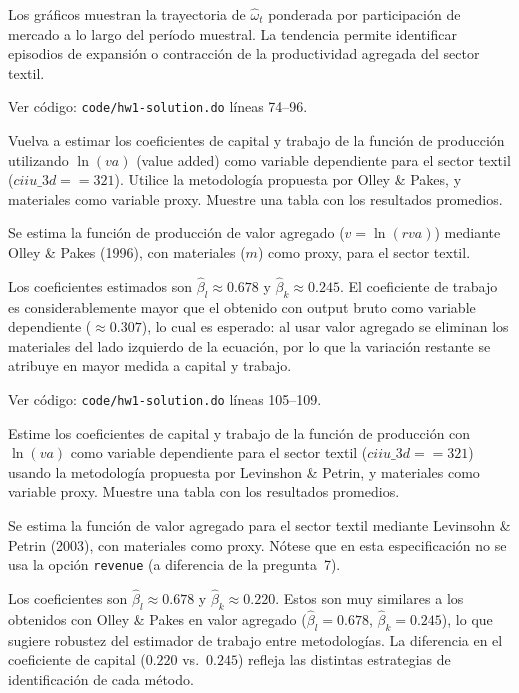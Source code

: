 \documentclass[answers]{exam}
\begin{document}
\begin{questions}
\begin{solution}
Los gráficos muestran la trayectoria de $\hat{\omega}_t$ ponderada por participación de mercado a lo largo del período muestral. La tendencia permite identificar episodios de expansión o contracción de la productividad agregada del sector textil.

Ver código: \texttt{code/hw1-solution.do} líneas 74--96.
\end{solution}

\question Vuelva a estimar los coeficientes de capital y trabajo de la función de producción utilizando $\ln(va)$ (value added) como variable dependiente para el sector textil ($\mathit{ciiu\_3d} == 321$). Utilice la metodología propuesta por Olley \& Pakes, y materiales como variable proxy. Muestre una tabla con los resultados promedios.

\begin{solution}
Se estima la función de producción de valor agregado ($v = \ln(\mathit{rva})$) mediante Olley \& Pakes (1996), con materiales ($m$) como proxy, para el sector textil.



Los coeficientes estimados son $\hat{\beta}_l \approx 0.678$ y $\hat{\beta}_k \approx 0.245$. El coeficiente de trabajo es considerablemente mayor que el obtenido con output bruto como variable dependiente ($\approx 0.307$), lo cual es esperado: al usar valor agregado se eliminan los materiales del lado izquierdo de la ecuación, por lo que la variación restante se atribuye en mayor medida a capital y trabajo.

Ver código: \texttt{code/hw1-solution.do} líneas 105--109.
\end{solution}

\question Estime los coeficientes de capital y trabajo de la función de producción con $\ln(va)$ como variable dependiente para el sector textil ($\mathit{ciiu\_3d} == 321$) usando la metodología propuesta por Levinshon \& Petrin, y materiales como variable proxy. Muestre una tabla con los resultados promedios.

\begin{solution}
Se estima la función de valor agregado para el sector textil mediante Levinsohn \& Petrin (2003), con materiales como proxy. Nótese que en esta especificación no se usa la opción \texttt{revenue} (a diferencia de la pregunta~7).



Los coeficientes son $\hat{\beta}_l \approx 0.678$ y $\hat{\beta}_k \approx 0.220$. Estos son muy similares a los obtenidos con Olley \& Pakes en valor agregado ($\hat{\beta}_l = 0.678$, $\hat{\beta}_k = 0.245$), lo que sugiere robustez del estimador de trabajo entre metodologías. La diferencia en el coeficiente de capital ($0.220$ vs.\ $0.245$) refleja las distintas estrategias de identificación de cada método.


\end{solution}
\end{questions}
\end{document}
